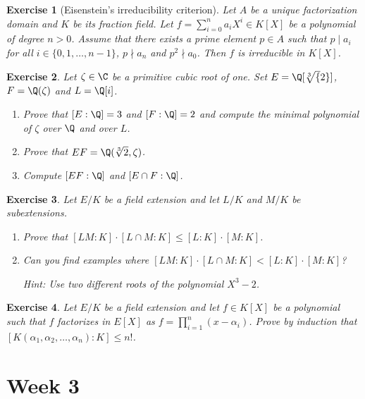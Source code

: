 \documentclass[a4paper,10pt,reqno]{amsart}
\newtheorem{ex}{Exercise}[section]
\begin{document}
\begin{ex} [Eisenstein's irreducibility criterion]\label{2.3}
    Let $A$ be a unique factorization domain and $K$ be its fraction field.
    Let $f=\sum_{i=0}^n a_iX^i\in K[X]$ be a polynomial of degree $n>0$. 
    Assume that there exists a prime element $p\in A$ such that
    $p\mid a_i$ for all $i\in\{0,1,\dots,n-1\}$, $p\nmid a_n$ and
    $p^2\nmid a_0$. Then $f$ is irreducible in $K[X]$. 
\end{ex}


\begin{ex}
\label{2.4}
Let $\zeta\in\C$ be a primitive cubic root of one.
Set $E=\Q[\sqrt[3]{2}]$, $F=\Q(\zeta)$ and $L=\Q[i]$.
\begin{enumerate}[label=(\roman*)]
    \item Prove that $[E:\Q]=3$ and $[F:\Q]=2$ and compute the minimal polynomial of $\zeta$ over $\Q$ and over $L$.
    \item Prove that $EF=\Q(\sqrt[3]{2},\zeta)$.
    \item Compute $[EF:\Q]$ and $[E\cap F:\Q]$.
\end{enumerate}  
\end{ex}

\begin{ex}\label{2.5}
    Let $E/K$ be a field extension and let $L/K$ and $M/K$ be subextensions.
    \begin{enumerate}[label=(\roman*)]
    \item Prove that $[LM : K ] \cdot [L \cap M : K] \leq [L:K] \cdot [M:K]$.
    \item Can you find examples where $[LM : K ] \cdot [L \cap M : K] < [L:K] \cdot [M:K]$?
    
    \noindent \textit{Hint:} Use two different roots of the polynomial $X^3 -2$.
    \end{enumerate}  
\end{ex}

\begin{ex}
\label{2.6}
    Let $E/K$ be a field extension and let $f \in K[X]$ be a polynomial such that $f$ factorizes in $E[X]$ as $f = \prod_{i=1}^n(x - \alpha_i)$. Prove by induction that $[K(\alpha_1,\alpha_2, \ldots, \alpha_n):K] \leq n!$.
\end{ex}

\newpage

\section{Week 3}
\end{document}
